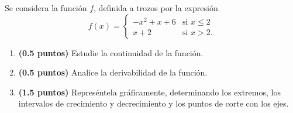 
Se considera la función $f$, definida a trozos por la expresión
\[
f(x)=\begin{cases}
-x^2+x+6 & \text{si }x\leq2\\[4pt]
x+2 & \text{si }x>2.
\end{cases}
\]
\begin{enumerate}[label=\alph*)]
\item \textbf{(0.5 puntos)} Estudie la continuidad de la función.
\item \textbf{(0.5 puntos)} Analice la derivabilidad de la función.
\item \textbf{(1.5 puntos)} Represéntela gráficamente, determinando los extremos, los intervalos de crecimiento y decrecimiento y los puntos de corte con los ejes.
\end{enumerate}
